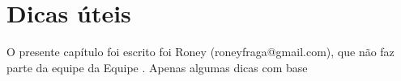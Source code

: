 \chapter{Dicas úteis}\label{cap_dicas}

O presente capítulo foi escrito foi Roney (roneyfraga@gmail.com), que não faz parte da equipe da Equipe \abnTeX . Apenas algumas dicas com base 



